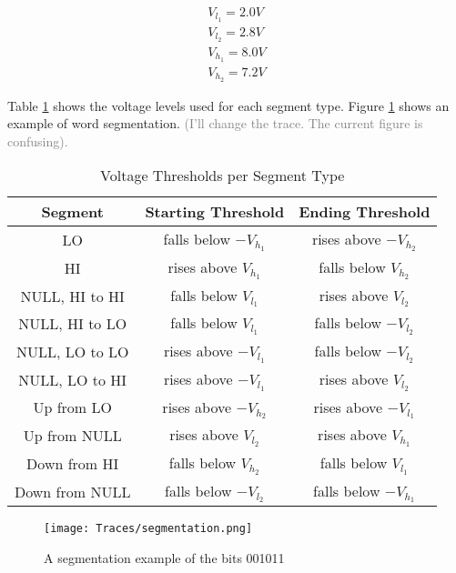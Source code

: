 \documentclass[conference]{IEEEtran}
\begin{document}
  \begin{align*}
    V_{l_1} = 2.0V \\
    V_{l_2} = 2.8V \\
    V_{h_1} = 8.0V \\
    V_{h_2} = 7.2V 
  \end{align*}
  
  Table \ref{tab:SegmentationLevels} shows the voltage levels used for each segment type. Figure \ref{fig:SegmentationTrace} shows an example of word segmentation. \textcolor{gray}{(I'll change the trace. The current figure is confusing).}
  
  \begin{table}
    \caption{Voltage Thresholds per Segment Type}
    \label{tab:SegmentationLevels}
    \centering
    \begin{tabular}{|c c c|} 
      \hline
      Segment & Starting Threshold & Ending Threshold \\ [0.5ex] 
      \hline\hline
      LO & falls below $-V_{h_1}$ & rises above $-V_{h_2}$ \\
      \hline
      HI & rises above $V_{h_1}$ & falls below $V_{h_2}$ \\
      \hline
      NULL, HI to HI & falls below $V_{l_1}$ & rises above $V_{l_2}$ \\
      \hline
      NULL, HI to LO & falls below $V_{l_1}$ & falls below $-V_{l_2}$ \\
      \hline
      NULL, LO to LO & rises above $-V_{l_1}$ & falls below $-V_{l_2}$ \\
      \hline
      NULL, LO to HI & rises above $-V_{l_1}$ & rises above $V_{l_2}$ \\
      \hline
      Up from LO & rises above $-V_{h_2}$ & rises above $-V_{l_1}$ \\
      \hline
      Up from NULL & rises above $V_{l_2}$ & rises above $V_{h_1}$ \\
      \hline
      Down from HI & falls below $V_{h_2}$ & falls below $V_{l_1}$ \\
      \hline
      Down from NULL & falls below $-V_{l_2}$ & falls below $-V_{h_1}$ \\
      \hline
    \end{tabular}
  \end{table}
  
  \begin{figure}[t]
    \centering
    \texttt{[image: Traces/segmentation.png]}
    \caption{A segmentation example of the bits 001011}
    \label{fig:SegmentationTrace}
  \end{figure}
  
\end{document}
